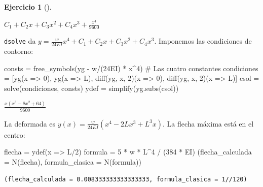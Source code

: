 \documentclass[
  spanish,
  a4paper,
]{scrreport}
\newenvironment{Shaded}{\begin{snugshade}}{\end{snugshade}}
\newcommand{\CommentTok}[1]{\textcolor[rgb]{0.37,0.37,0.37}{#1}}
\newcommand{\FloatTok}[1]{\textcolor[rgb]{0.68,0.00,0.00}{#1}}
\newcommand{\FunctionTok}[1]{\textcolor[rgb]{0.28,0.35,0.67}{#1}}
\newcommand{\NormalTok}[1]{\textcolor[rgb]{0.00,0.23,0.31}{#1}}
\newcommand{\OperatorTok}[1]{\textcolor[rgb]{0.37,0.37,0.37}{#1}}
\theoremstyle{definition}
\newtheorem{exercise}{Ejercicio}[chapter]
\theoremstyle{remark}
\begin{document}
\begin{exercise}[]
\begin{tcolorbox}
$C_{1} + C_{2} x + C_{3} x^{2} + C_{4} x^{3} + \frac{x^{4}}{9600}$

\texttt{dsolve} da
\(y = \frac{w}{24EI}x^4 + C_1 + C_2x + C_3x^2 + C_4x^3\). Imponemos las
condiciones de contorno:

\begin{Shaded}
\begin{Highlighting}[]
\NormalTok{consts }\OperatorTok{=} \FunctionTok{free\_symbols}\NormalTok{(yg }\OperatorTok{{-}}\NormalTok{ w}\OperatorTok{/}\NormalTok{(}\FloatTok{24}\NormalTok{EI) }\OperatorTok{*}\NormalTok{ x}\OperatorTok{\^{}}\FloatTok{4}\NormalTok{)   }\CommentTok{\# Las cuatro constantes}
\NormalTok{condiciones }\OperatorTok{=}\NormalTok{ [}\FunctionTok{yg}\NormalTok{(x }\OperatorTok{=\textgreater{}} \FloatTok{0}\NormalTok{), }\FunctionTok{yg}\NormalTok{(x }\OperatorTok{=\textgreater{}}\NormalTok{ L),}
               \FunctionTok{diff}\NormalTok{(yg, x, }\FloatTok{2}\NormalTok{)(x }\OperatorTok{=\textgreater{}} \FloatTok{0}\NormalTok{), }\FunctionTok{diff}\NormalTok{(yg, x, }\FloatTok{2}\NormalTok{)(x }\OperatorTok{=\textgreater{}}\NormalTok{ L)]}
\NormalTok{csol }\OperatorTok{=} \FunctionTok{solve}\NormalTok{(condiciones, consts)}
\NormalTok{ydef }\OperatorTok{=} \FunctionTok{simplify}\NormalTok{(yg.}\FunctionTok{subs}\NormalTok{(csol))}
\end{Highlighting}
\end{Shaded}

$\frac{x \left(x^{3} - 8 x^{2} + 64\right)}{9600}$

La deformada es
\(y(x) = \frac{w}{24EI}\left(x^4 - 2Lx^3 + L^3 x\right)\). La flecha
máxima está en el centro:

\begin{Shaded}
\begin{Highlighting}[]
\NormalTok{flecha }\OperatorTok{=} \FunctionTok{ydef}\NormalTok{(x }\OperatorTok{=\textgreater{}}\NormalTok{ L}\OperatorTok{/}\FloatTok{2}\NormalTok{)}
\NormalTok{formula }\OperatorTok{=} \FloatTok{5} \OperatorTok{*}\NormalTok{ w }\OperatorTok{*}\NormalTok{ L}\OperatorTok{\^{}}\FloatTok{4} \OperatorTok{/}\NormalTok{ (}\FloatTok{384} \OperatorTok{*}\NormalTok{ EI)}
\NormalTok{(flecha\_calculada }\OperatorTok{=} \FunctionTok{N}\NormalTok{(flecha), formula\_clasica }\OperatorTok{=} \FunctionTok{N}\NormalTok{(formula))}
\end{Highlighting}
\end{Shaded}

\begin{verbatim}
(flecha_calculada = 0.008333333333333333, formula_clasica = 1//120)
\end{verbatim}


\end{tcolorbox}
\end{exercise}
\end{document}
